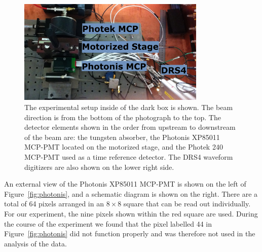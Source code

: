\documentclass[12pt]{article}
\begin{document}
\begin{figure}[htbp] 
\centering
\includegraphics[width=0.8\textwidth]{Images/setup/setup.png} 
\caption{The experimental setup inside of the dark box is shown. The beam direction is from
the bottom of the photograph to the top. The detector elements shown in the
order from upstream to downstream of the beam are: the tungsten absorber, the
Photonis XP85011 MCP-PMT located on the motorized stage, and the Photek 240
MCP-PMT used as a time reference detector. The DRS4 waveform digitizers are also
shown on the lower right side.} 
\label{fig:setup} 
\end{figure} 

An external view
of the Photonis XP85011 MCP-PMT is shown on the left of Figure~\ref{fig:photonis},
and a schematic diagram is shown on the right. There are a total of 64 pixels
arranged in an $8\times8$ square that can be read out individually. For our
experiment, the nine pixels shown within the red square are used. During the
course of the experiment we found that the pixel labelled 44 in
Figure~\ref{fig:photonis} did not function properly and was therefore not used
in the analysis of the data. 
\end{document}
